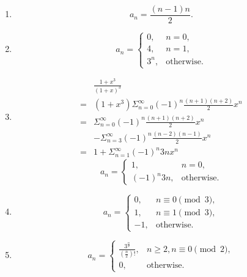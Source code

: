 \documentclass{sig-alternate-05-2015}
\begin{document}
\begin{enumerate}
\begin{enumerate}
		\item \begin{equation}
			a_n = \frac{(n - 1)n}{2}.
		\end{equation}
		\item \begin{equation}
			a_n = \begin{cases}
				0, & n = 0,\\
				4, & n = 1,\\
				3^n, & \text{otherwise}.
			\end{cases}
		\end{equation}
		\item \begin{align}
			& \frac{1 + x^3}{(1 + x)^3}\\
			= & (1 + x^3) \Sigma_{n = 0}^\infty (-1)^n \frac{(n + 1)(n + 2)}{2} x^n\\
			= & \Sigma_{n = 0}^\infty (-1)^n \frac{(n + 1)(n + 2)}{2} x^n\\
			& - \Sigma_{n = 3}^\infty (-1)^n \frac{(n - 2)(n - 1)}{2} x^n\\
			= & 1 + \Sigma_{n = 1}^\infty (-1)^n 3n x^n
		\end{align}
		\begin{equation}
			a_n = \begin{cases}
			1, & n = 0,\\
			(-1)^n 3n, & \text{otherwise}.
			\end{cases}
		\end{equation}
		\item \begin{equation}
			a_n = \begin{cases}
				0, & n \equiv 0 \pmod{3},\\
				1, & n \equiv 1 \pmod{3},\\
				-1, & \text{otherwise}.
			\end{cases}
		\end{equation}
		\item \begin{equation}
			a_n = \begin{cases}
				\frac{3^{\frac{n}{2}}}{(\frac{n}{2})!}, & n \ge 2, n \equiv 0 \pmod{2},\\
				0, & \text{otherwise}.
			\end{cases}
		\end{equation}
	\end{enumerate}
\end{enumerate}
\end{document}
